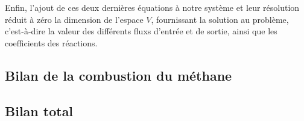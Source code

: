 Enfin, l'ajout de ces deux dernières équations à notre système et leur résolution\footnotemark{} réduit à zéro la dimension de l'espace $V$, fournissant la solution au problème, c'est-à-dire la valeur des différents fluxs d'entrée et de sortie, ainsi que les coefficients des réactions.





\subsection{Bilan de la combustion du méthane}



\subsection{Bilan total}
